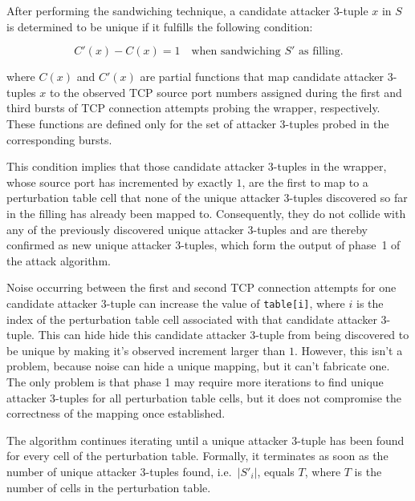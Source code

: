 \documentclass[twocolumn]{report}
\begin{document}
After performing the sandwiching technique, a \alert{candidate attacker 3-tuple} \( x \) in $S$ is determined to be \alert{unique} if it fulfills the following \alert{condition}:

\vspace{-0.2cm}
\begin{minipage}{\columnwidth}
	\begin{equation*}
		C'(x) - C(x) = 1
		\quad \text{when sandwiching } S' \text{ as filling.}
	\end{equation*}
\end{minipage}

where \(C(x)\) and \(C'(x)\) are partial functions that map \alert{candidate attacker 3-tuples \( x \) to} the observed \alert{TCP source port} numbers assigned during the first and third bursts of TCP connection attempts probing the wrapper, respectively. These functions are defined only for the set of attacker 3-tuples probed in the corresponding bursts.

This \alert{condition implies} that those candidate attacker 3-tuples in the wrapper, whose source port has incremented by exactly $1$, are the first to map to a perturbation table cell that none of the unique attacker 3-tuples discovered so far in the filling has already been mapped to. Consequently, they do not collide with any of the previously discovered unique attacker 3-tuples and are thereby confirmed as new \alert{unique attacker 3-tuples}, which form the \alert{output} of phase~1 of the attack algorithm.

\alert{Noise} occurring between the first and second TCP connection attempts for one candidate attacker 3-tuple can increase the value of \texttt{table[i]}, where $i$ is the index of the perturbation table cell associated with that candidate attacker 3-tuple. This \alert{can hide} hide this candidate attacker 3-tuple from being discovered to be unique by making it's observed increment larger than $1$. However, this isn’t a problem, because noise can hide a unique mapping, but it \alert{can’t fabricate} one. The only problem is that phase 1 may require more iterations to find unique attacker 3-tuples for all perturbation table cells, but it does not compromise the correctness of the mapping once established.

The algorithm continues iterating until a unique attacker 3-tuple has been found for every cell of the perturbation table. Formally, it \alert{terminates} as soon as the number of unique attacker 3-tuples found, i.e.\ $\lvert S'_i \rvert$, equals $T$, where $T$ is the number of cells in the perturbation table.
\end{document}
